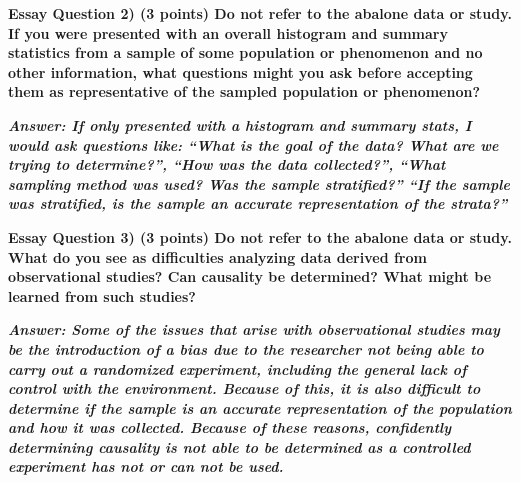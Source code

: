 \documentclass[
]{article}
\begin{document}
\textbf{Essay Question 2) (3 points) Do not refer to the abalone data or
study. If you were presented with an overall histogram and summary
statistics from a sample of some population or phenomenon and no other
information, what questions might you ask before accepting them as
representative of the sampled population or phenomenon?}

\textbf{\emph{Answer: If only presented with a histogram and summary
stats, I would ask questions like: ``What is the goal of the data? What
are we trying to determine?'', ``How was the data collected?'', ``What
sampling method was used? Was the sample stratified?'' ``If the sample
was stratified, is the sample an accurate representation of the
strata?'' }}

\textbf{Essay Question 3) (3 points) Do not refer to the abalone data or
study. What do you see as difficulties analyzing data derived from
observational studies? Can causality be determined? What might be
learned from such studies?}

\textbf{\emph{Answer: Some of the issues that arise with observational
studies may be the introduction of a bias due to the researcher not
being able to carry out a randomized experiment, including the general
lack of control with the environment. Because of this, it is also
difficult to determine if the sample is an accurate representation of
the population and how it was collected. Because of these reasons,
confidently determining causality is not able to be determined as a
controlled experiment has not or can not be used. }}
\end{document}
